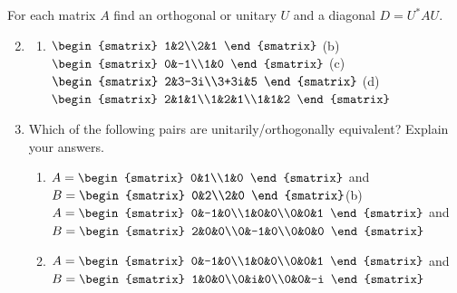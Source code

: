 \begin{exercises}
\exstart\label{ex:orthequiv1} For each matrix $A$ find an orthogonal or unitary $U$ and a diagonal $D=U^*AU$.

\begin{enumerate}\setcounter{enumi}{1}  
  \item[]\begin{enumerate}
    \item $\begin{smatrix}
    1&2\\2&1
    \end{smatrix}$
    \qquad
    (b)\ \ $\begin{smatrix}
    0&-1\\1&0
    \end{smatrix}$
    \qquad
    (c)\ \ $\begin{smatrix}
    2&3-3i\\3+3i&5
    \end{smatrix}$
    \qquad
    (d)\ \ $\begin{smatrix}
    2&1&1\\1&2&1\\1&1&2
    \end{smatrix}$
  \end{enumerate}
  
  \item Which of the following pairs are unitarily/orthogonally equivalent? Explain your answers.
  \begin{enumerate}
    \item $A=\begin{smatrix}
    0&1\\1&0
    \end{smatrix}$ and $B=\begin{smatrix}
    0&2\\2&0
    \end{smatrix}$\qquad\quad (b)\ \ $A=\begin{smatrix}
    0&-1&0\\1&0&0\\0&0&1
    \end{smatrix}$ and $B=\begin{smatrix}
    2&0&0\\0&-1&0\\0&0&0
    \end{smatrix}$
    \item[(c)] $A=\begin{smatrix}
    0&-1&0\\1&0&0\\0&0&1
    \end{smatrix}$ and $B=\begin{smatrix}
    1&0&0\\0&i&0\\0&0&-i
    \end{smatrix}$
  \end{enumerate}
	

\end{enumerate}
\end{exercises}
